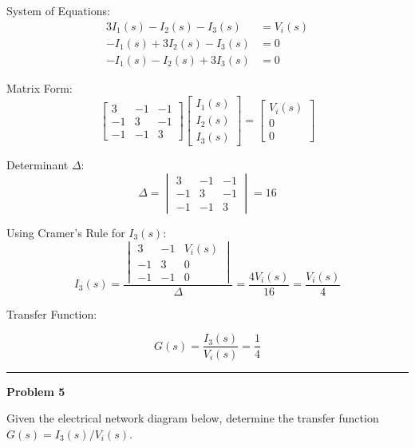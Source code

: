 ﻿\documentclass[11pt]{article}
\begin{document}
{System of Equations:}
\[
\begin{aligned}
3I_1(s) - I_2(s) - I_3(s) &= V_i(s) \\
-I_1(s) + 3I_2(s) - I_3(s) &= 0 \\
-I_1(s) - I_2(s) + 3I_3(s) &= 0
\end{aligned}
\]

{Matrix Form:}
\[
\begin{bmatrix}
3 & -1 & -1 \\
-1 & 3 & -1 \\
-1 & -1 & 3
\end{bmatrix}
\begin{bmatrix}
I_1(s) \\ I_2(s) \\ I_3(s)
\end{bmatrix}
=
\begin{bmatrix}
V_i(s) \\ 0 \\ 0
\end{bmatrix}
\]

{Determinant \(\Delta\):}
\[
\Delta =
\begin{vmatrix}
3 & -1 & -1 \\
-1 & 3 & -1 \\
-1 & -1 & 3
\end{vmatrix}
= 16
\]

{Using Cramer's Rule for \(I_3(s)\):}
\[
I_3(s) =
\frac{
\begin{vmatrix}
3 & -1 & V_i(s) \\
-1 & 3 & 0 \\
-1 & -1 & 0
\end{vmatrix}
}
{\Delta}
= \frac{4V_i(s)}{16} = \frac{V_i(s)}{4}
\]


{Transfer Function:}

\[
\boxed{
G(s) = \frac{I_3(s)}{V_i(s)} = \frac{1}{4}
}
\]
\newpage
  \setcounter{page}{7}
\noindent\rule{\textwidth}{1pt}
\noindent\textbf{Problem 5} \hfill 

\noindent Given the electrical network diagram below, determine the transfer function $G(s) = I_3(s)/V_i(s)$.
\end{document}
